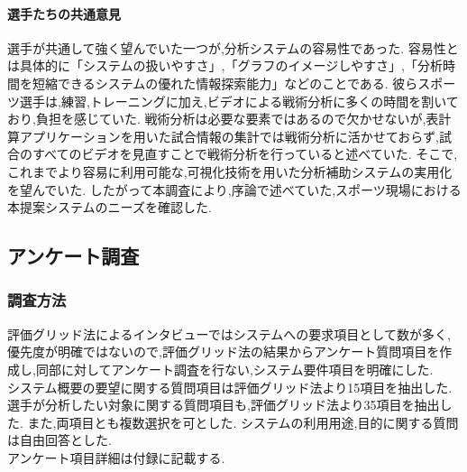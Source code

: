\documentclass[sotsuron]{kuee}
\begin{document}
				\paragraph{選手たちの共通意見}
					選手が共通して強く望んでいた一つが,分析システムの容易性であった.
					容易性とは具体的に「システムの扱いやすさ」,「グラフのイメージしやすさ」,「分析時間を短縮できるシステムの優れた情報探索能力」などのことである.
					彼らスポーツ選手は,練習,トレーニングに加え,ビデオによる戦術分析に多くの時間を割いており,負担を感じていた.
					戦術分析は必要な要素ではあるので欠かせないが,表計算アプリケーションを用いた試合情報の集計では戦術分析に活かせておらず,試合のすべてのビデオを見直すことで戦術分析を行っていると述べていた.
					そこで,これまでより容易に利用可能な,可視化技術を用いた分析補助システムの実用化を望んでいた.
					したがって本調査により,序論で述べていた,スポーツ現場における本提案システムのニーズを確認した.
		\subsection{アンケート調査}
			\subsubsection{調査方法}
				評価グリッド法によるインタビューではシステムへの要求項目として数が多く,優先度が明確ではないので,評価グリッド法の結果からアンケート質問項目を作成し,同部に対してアンケート調査を行ない,システム要件項目を明確にした.
				\\システム概要の要望に関する質問項目は評価グリッド法より15項目を抽出した.
				選手が分析したい対象に関する質問項目も,評価グリッド法より35項目を抽出した.
				また,両項目とも複数選択を可とした.
				システムの利用用途,目的に関する質問は自由回答とした.
				\\アンケート項目詳細は付録に記載する.
\end{document}
